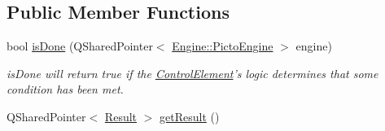 \subsection*{Public Member Functions}
\begin{DoxyCompactItemize}
\item 
\hypertarget{class_picto_1_1_choice_controller_abaa4d7f742e0678dc151da1a91be8b0c}{bool \hyperlink{class_picto_1_1_choice_controller_abaa4d7f742e0678dc151da1a91be8b0c}{is\-Done} (Q\-Shared\-Pointer$<$ \hyperlink{class_picto_1_1_engine_1_1_picto_engine}{Engine\-::\-Picto\-Engine} $>$ engine)}\label{class_picto_1_1_choice_controller_abaa4d7f742e0678dc151da1a91be8b0c}

\begin{DoxyCompactList}\small\item\em is\-Done will return true if the \hyperlink{class_picto_1_1_control_element}{Control\-Element}'s logic determines that some condition has been met. \end{DoxyCompactList}\item 
\hypertarget{class_picto_1_1_choice_controller_aec72650832723f78b6faf7de9cdbf2e8}{Q\-Shared\-Pointer$<$ \hyperlink{class_picto_1_1_result}{Result} $>$ \hyperlink{class_picto_1_1_choice_controller_aec72650832723f78b6faf7de9cdbf2e8}{get\-Result} ()}\label{class_picto_1_1_choice_controller_aec72650832723f78b6faf7de9cdbf2e8}


\end{DoxyCompactItemize}
